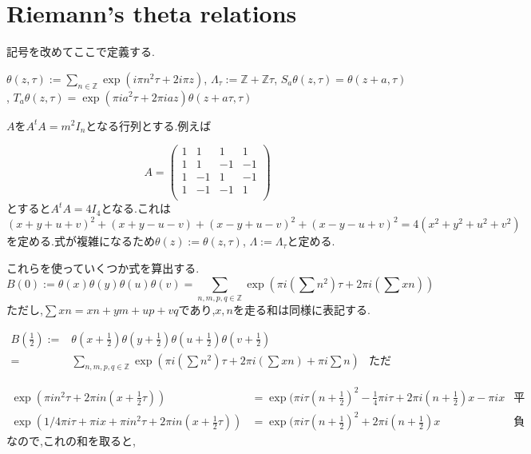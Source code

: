 \documentclass[uplatex,b5j,11pt]{jsbook}
\begin{document}
\section{Riemann's theta relations}

記号を改めてここで定義する.

$\theta(z, \tau):= \sum_{n \in \mathbb{Z}}  \exp (i \pi n^2 \tau + 2i \pi z)$,
$\Lambda_{\tau}:= \mathbb{Z}+ \mathbb{Z}\tau$,
$S_a\theta(z, \tau) = \theta(z + a, \tau)$,
$T_a\theta(z, \tau) = \exp(\pi i a^2 \tau + 2\pi i a z) \theta(z + a\tau, \tau)$

$A$を$A^tA = m^2I_n$となる行列とする.例えば

\begin{equation*}
A =
\begin{pmatrix}
1 &  1 &  1 &  1 \\
1 &  1 & -1 & -1 \\
1 & -1 &  1 & -1 \\
1 & -1 & -1 &  1 \\
\end{pmatrix}
\end{equation*}
とすると$A^tA = 4I_4$となる.これは
\begin{equation*}
 (x+y+u+v)^2 + (x+y-u-v) + (x-y+u-v)^2 + (x-y-u+v)^2 = 4(x^2 + y^2 + u^2 + v^2)
\end{equation*}
を定める.式が複雑になるため$\theta(z):=\theta(z, \tau)$, $\Lambda := \Lambda_{\tau}$と定める.

これらを使っていくつか式を算出する.
\begin{equation*}
B(0) := \theta(x)\theta(y)\theta(u)\theta(v) = \sum_{n,m,p,q \in \mathbb{Z}} \exp\left( \pi i (\sum n^2) \tau + 2 \pi i (\sum xn)\right)
\end{equation*}
ただし,$\sum xn = xn + ym + up + vq$であり,$x,n$を走る和は同様に表記する.

\begin{align*}
B\left(\frac{1}{2}\right) := &\theta(x+\frac{1}{2})\theta(y+\frac{1}{2})\theta(u+\frac{1}{2})\theta(v+\frac{1}{2}) \\
 = &\sum_{n,m,p,q \in \mathbb{Z}} \exp\left( \pi i (\sum n^2) \tau + 2 \pi i (\sum xn) +  \pi i \sum n\right)  & \mbox{ただx+1/2を展開しただけ}
\end{align*}

\begin{align*}
\exp( \pi i n^2 \tau + 2 \pi i n(x+\frac{1}{2}\tau)) & = \exp(\pi i \tau(n+\frac{1}{2})^2 - \frac{1}{4} \pi i \tau  + 2\pi i (n+ \frac{1}{2})x - \pi i x  & \mbox{平方完成}\\
\exp(1/4 \pi i \tau + \pi i x +  \pi i n^2 \tau + 2 \pi i n(x+\frac{1}{2}\tau)) & = \exp(\pi i \tau(n+\frac{1}{2})^2   + 2\pi i (n+ \frac{1}{2})x & \mbox{負の項を移項}
\end{align*}
なので,これの和を取ると,
\end{document}
